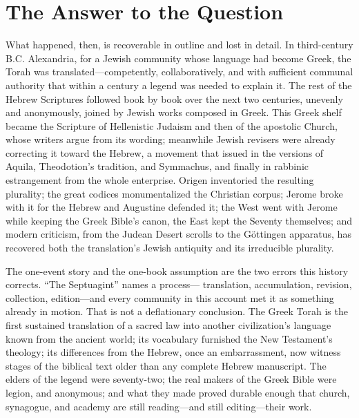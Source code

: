 \section{The Answer to the Question}

What happened, then, is recoverable in outline and lost in detail. In
third-century B.C. Alexandria, for a Jewish community whose language had
become Greek, the Torah was translated---competently, collaboratively, and
with sufficient communal authority that within a century a legend was
needed to explain it. The rest of the Hebrew Scriptures followed book by
book over the next two centuries, unevenly and anonymously, joined by
Jewish works composed in Greek. This Greek shelf became the Scripture of
Hellenistic Judaism and then of the apostolic Church, whose writers argue
from its wording; meanwhile Jewish revisers were already correcting it
toward the Hebrew, a movement that issued in the versions of Aquila,
Theodotion's tradition, and Symmachus, and finally in rabbinic
estrangement from the whole enterprise. Origen inventoried the resulting
plurality; the great codices monumentalized the Christian corpus; Jerome
broke with it for the Hebrew and Augustine defended it; the West went with
Jerome while keeping the Greek Bible's canon, the East kept the Seventy
themselves; and modern criticism, from the Judean Desert scrolls to the
G\"ottingen apparatus, has recovered both the translation's Jewish
antiquity and its irreducible plurality.

The one-event story and the one-book assumption are the two errors this
history corrects. ``The Septuagint'' names a process--- translation,
accumulation, revision, collection, edition---and every community in this
account met it as something already in motion. That is not a deflationary
conclusion. The Greek Torah is the first sustained translation of a
sacred law into another civilization's language known from the ancient
world; its vocabulary furnished the New Testament's theology; its
differences from the Hebrew, once an embarrassment, now witness stages of
the biblical text older than any complete Hebrew manuscript. The elders
of the legend were seventy-two; the real makers of the Greek Bible were
legion, and anonymous; and what they made proved durable enough that
church, synagogue, and academy are still reading---and still
editing---their work.
